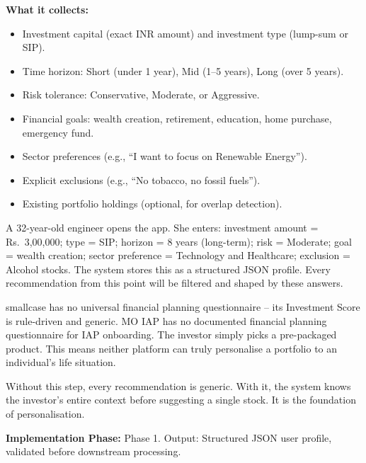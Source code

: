 \documentclass[12pt, a4paper, openany, oneside]{report}
\newcommand{\rupee}{Rs.~}
\begin{document}
\textbf{What it collects:}
\begin{itemize}
  \item Investment capital (exact INR amount) and investment type (lump-sum or SIP).
  \item Time horizon: Short (under 1 year), Mid (1--5 years), Long (over 5 years).
  \item Risk tolerance: Conservative, Moderate, or Aggressive.
  \item Financial goals: wealth creation, retirement, education, home purchase, emergency fund.
  \item Sector preferences (e.g., ``I want to focus on Renewable Energy'').
  \item Explicit exclusions (e.g., ``No tobacco, no fossil fuels'').
  \item Existing portfolio holdings (optional, for overlap detection).
\end{itemize}

\begin{examplebox}
A 32-year-old engineer opens the app. She enters: investment amount = \rupee3,00,000; type = SIP; horizon = 8 years (long-term); risk = Moderate; goal = wealth creation; sector preference = Technology and Healthcare; exclusion = Alcohol stocks. The system stores this as a structured JSON profile. Every recommendation from this point will be filtered and shaped by these answers.
\end{examplebox}

\begin{gapbox}
smallcase has no universal financial planning questionnaire -- its Investment Score is rule-driven and generic. MO IAP has no documented financial planning questionnaire for IAP onboarding. The investor simply picks a pre-packaged product. This means neither platform can truly personalise a portfolio to an individual's life situation.
\end{gapbox}

\begin{valuebox}
Without this step, every recommendation is generic. With it, the system knows the investor's entire context before suggesting a single stock. It is the foundation of personalisation.
\end{valuebox}

\textbf{Implementation Phase:} Phase 1. Output: Structured JSON user profile, validated before downstream processing.

\end{document}
